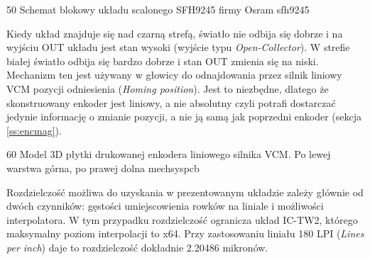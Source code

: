 	{50}
	{Schemat blokowy układu scalonego SFH9245 firmy Osram}
	{sfh9245}

Kiedy układ znajduje się nad czarną strefą, światło nie odbija się dobrze i na wyjściu OUT układu jest stan wysoki (wyjście typu {\it Open-Collector}). W strefie białej światło odbija się bardzo dobrze i stan OUT zmienia się na niski. Mechanizm ten jest używany w głowicy do odnajdowania przez silnik liniowy VCM pozycji odniesienia ({\it Homing position}). Jest to niezbędne, dlatego że skonstruowany enkoder jest liniowy, a nie absolutny czyli potrafi dostarczać jedynie informację o zmianie pozycji, a nie ją samą jak poprzedni enkoder (sekcja \ref{ss:encmag}).

	{60}
	{Model 3D płytki drukowanej enkodera liniowego silnika VCM. Po lewej warstwa górna, po prawej dolna}
	{mechsyspcb}

Rozdzielczość możliwa do uzyskania w prezentowanym układzie zależy głównie od dwóch czynników: gęstości umiejscowienia rowków na liniale i możliwości interpolatora. W tym przypadku rozdzielczość ogranicza układ IC-TW2, którego maksymalny poziom interpolacji to x64. Przy zastosowaniu liniału 180 LPI ({\it Lines per inch}) daje to rozdzielczość dokładnie 2.20486 mikronów.





\clearpage















